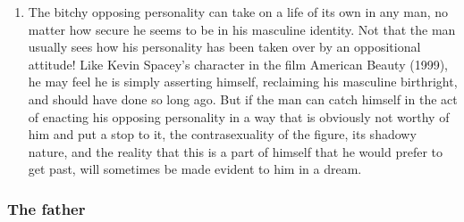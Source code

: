 \begin{enumerate}
\item {} The bitchy opposing personality can take on
a life of its own in any man, no matter how secure he seems to be in his
masculine identity. Not that the man usually sees how his personality has been
taken over by an oppositional attitude! Like Kevin Spacey's character in the
film American Beauty (1999), he may feel he is simply asserting himself,
reclaiming his masculine birthright, and should have done so long ago. But if
the man can catch himself in the act of enacting his opposing personality in a
way that is obviously not worthy of him and put a stop to it, the
contrasexuality of the figure, its shadowy nature, and the reality that this is
a part of himself that he would prefer to get past, will sometimes be made
evident to him in a dream.

\end{enumerate}

\subsubsection{The father}

